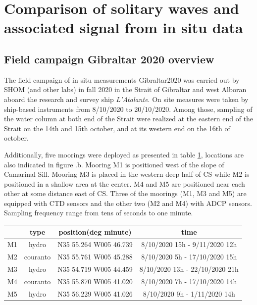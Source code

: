 \hypersetup{pdfborder=0 0 0}


\section{Comparison of solitary waves and associated signal from in situ data}
\label{sectionCampagne}

\subsection{Field campaign Gibraltar 2020 overview}
The field campaign of in situ measurements Gibraltar2020 was carried out by SHOM (and other labs) in fall 2020 in the Strait of Gibraltar and west Alboran aboard the research and survey ship \textit{L'Atalante}. On site measures were taken by ship-based instruments from 8/10/2020 to 20/10/2020. Among those, sampling of the water column at both end of the Strait were realized at the eastern end of the Strait on the 14th and 15th october, and at its western end on the 16th of october.

Additionally, five moorings were deployed as presented in table \ref{tab_moor}, locations are also indicated in figure .b. Mooring M1 is positioned west of the slope of Camarinal Sill. Mooring M3 is placed in the western deep half of CS while M2 is positioned in a shallow area at the center. M4 and M5 are positioned near each other at some distance east of CS. Three of the moorings (M1, M3 and M5) are equipped with CTD sensors and the other two (M2 and M4) with ADCP sensors. Sampling frequency range from tens of seconds to one minute.


\begin{table}[!h]
        \centering
        \begin{tabular}{|c|c|c|c|}
                \hline
                 & type & position(deg minute) & time \\ 
                 \hline
                M1 & hydro & N35 55.264 W005 46.739 & 8/10/2020 15h - 9/11/2020 12h\\
                M2 & couranto & N35 55.761 W005 45.288 & 8/10/2020 5h - 17/10/2020 15h\\
                M3 & hydro & N35 54.719 W005 44.459 & 8/10/2020 13h - 22/10/2020 21h\\
                M4 & couranto & N35 55.870 W005 41.020 & 8/10/2020 7h - 17/10/2020 14h\\
                M5 & hydro & N35 56.229 W005 41.026 & 8/10/2020 9h - 1/11/2020 14h\\
                \hline
        \end{tabular}
        \label{tab_moor}
\end{table}

